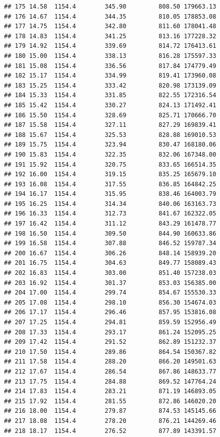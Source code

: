 \documentclass[]{article}
\begin{document}
\begin{verbatim}
## 175 14.58  1154.4        345.90         808.50 179663.13
## 176 14.67  1154.4        344.35         810.05 178853.08
## 177 14.75  1154.4        342.80         811.60 178041.48
## 178 14.83  1154.4        341.25         813.16 177228.32
## 179 14.92  1154.4        339.69         814.72 176413.61
## 180 15.00  1154.4        338.13         816.28 175597.33
## 181 15.08  1154.4        336.56         817.84 174779.49
## 182 15.17  1154.4        334.99         819.41 173960.08
## 183 15.25  1154.4        333.42         820.98 173139.09
## 184 15.33  1154.4        331.85         822.55 172316.54
## 185 15.42  1154.4        330.27         824.13 171492.41
## 186 15.50  1154.4        328.69         825.71 170666.70
## 187 15.58  1154.4        327.11         827.29 169839.41
## 188 15.67  1154.4        325.53         828.88 169010.53
## 189 15.75  1154.4        323.94         830.47 168180.06
## 190 15.83  1154.4        322.35         832.06 167348.00
## 191 15.92  1154.4        320.75         833.65 166514.35
## 192 16.00  1154.4        319.15         835.25 165679.10
## 193 16.08  1154.4        317.55         836.85 164842.25
## 194 16.17  1154.4        315.95         838.46 164003.79
## 195 16.25  1154.4        314.34         840.06 163163.73
## 196 16.33  1154.4        312.73         841.67 162322.05
## 197 16.42  1154.4        311.12         843.29 161478.77
## 198 16.50  1154.4        309.50         844.90 160633.86
## 199 16.58  1154.4        307.88         846.52 159787.34
## 200 16.67  1154.4        306.26         848.14 158939.20
## 201 16.75  1154.4        304.63         849.77 158089.43
## 202 16.83  1154.4        303.00         851.40 157238.03
## 203 16.92  1154.4        301.37         853.03 156385.00
## 204 17.00  1154.4        299.74         854.67 155530.33
## 205 17.08  1154.4        298.10         856.30 154674.03
## 206 17.17  1154.4        296.46         857.95 153816.08
## 207 17.25  1154.4        294.81         859.59 152956.49
## 208 17.33  1154.4        293.17         861.24 152095.25
## 209 17.42  1154.4        291.52         862.89 151232.37
## 210 17.50  1154.4        289.86         864.54 150367.82
## 211 17.58  1154.4        288.20         866.20 149501.63
## 212 17.67  1154.4        286.54         867.86 148633.77
## 213 17.75  1154.4        284.88         869.52 147764.24
## 214 17.83  1154.4        283.21         871.19 146893.05
## 215 17.92  1154.4        281.55         872.86 146020.20
## 216 18.00  1154.4        279.87         874.53 145145.66
## 217 18.08  1154.4        278.20         876.21 144269.46
## 218 18.17  1154.4        276.52         877.89 143391.57

\end{verbatim}
\end{document}
